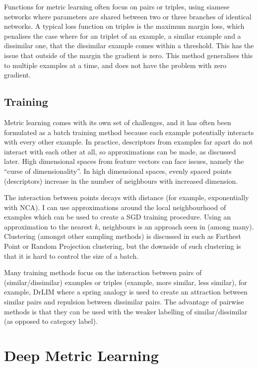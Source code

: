 Functions for metric learning often focus on pairs or triples, using siamese networks where parameters are shared between two or three branches of identical networks. A typical loss function on triples is the maximum margin loss, which penalises the case where for an triplet of an example, a similar example and a dissimilar one, that the dissimilar example comes within a threshold. This has the issue that outside of the margin the gradient is zero. This method generalises this to multiple examples at a time, and does not have the problem with zero gradient.

\subsection {Training}

Metric learning comes with its own set of challenges, and it has often been formulated as a batch training method because each example potentially interacts with every other example. In practice, descriptors from examples far apart do not interact with each other at all, so approximations can be made, as discussed later. High dimensional spaces from feature vectors can face issues, namely the ``curse of dimensionality''. In high dimensional spaces, evenly spaced points (descriptors) increase in the number of neighbours with increased dimension. 

The interaction between points decays with distance (for example, exponentially with \gls{NCA}). I can use approximations around the local neighbourhood of examples which can be used to create a \gls{SGD} training procedure. Using an approximation to the nearest $ k $, neighbours is an approach seen in \cite{Mensink2012,Zaidi2011} (among many). Clustering (amongst other sampling methods) is discussed in  \cite{Oneat2011} such as Farthest Point or Random Projection clustering, but the downside of such clustering is that it is hard to control the size of a batch. 

Many training methods focus on the interaction between pairs of (similar/dissimilar) examples or triples (example, more similar, less similar), for example, DrLIM \cite{Hadsell2006} where a spring analogy is used to create an attraction between similar pairs and repulsion between dissimilar pairs. The advantage of pairwise methods is that they can be used with the weaker labelling of similar/dissimilar (as opposed to category label).

\section {Deep Metric Learning}

